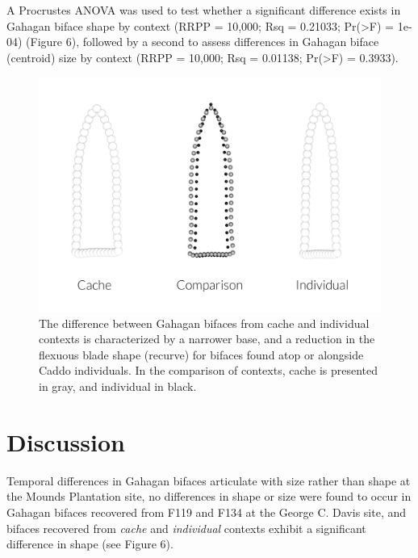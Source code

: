 \documentclass[]{interact}
\theoremstyle{plain}%
\theoremstyle{definition}
\theoremstyle{remark}
\begin{document}
A Procrustes ANOVA was used to test whether a significant difference
exists in Gahagan biface shape by context (RRPP = 10,000; Rsq = 0.21033;
Pr(\textgreater F) = 1e-04) (Figure 6), followed by a second to assess
differences in Gahagan biface (centroid) size by context (RRPP = 10,000;
Rsq = 0.01138; Pr(\textgreater F) = 0.3933).

\begin{figure}

{\centering \includegraphics[width=1\linewidth]{img/fig05} 

}

\caption{The difference between Gahagan bifaces from cache and individual contexts is characterized by a narrower base, and a reduction in the flexuous blade shape (recurve) for bifaces found atop or alongside Caddo individuals. In the comparison of contexts, cache is presented in gray, and individual in black.}\label{fig:mshape.bpractice}
\end{figure}

\hypertarget{discussion}{%
\section{Discussion}\label{discussion}}

Temporal differences in Gahagan bifaces articulate with size rather than
shape at the Mounds Plantation site, no differences in shape or size
were found to occur in Gahagan bifaces recovered from F119 and F134 at
the George C. Davis site, and bifaces recovered from \emph{cache} and
\emph{individual} contexts exhibit a significant difference in shape
(see Figure 6).
\end{document}
